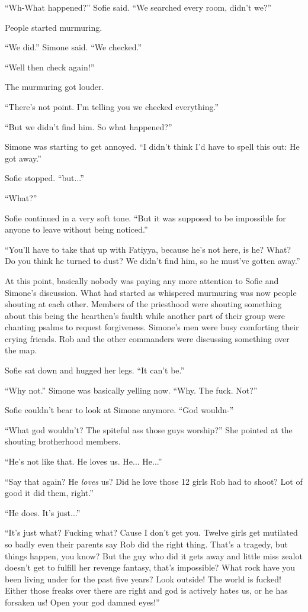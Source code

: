 \documentclass[letterpaper,12pt]{report}
\begin{document}
``Wh-What happened?'' Sofie said. ``We searched every room, didn't we?''

People started murmuring.

``We did.'' Simone said. ``We checked.''

``Well then check again!''

The murmuring got louder.

``There's not point. I'm telling you we checked everything.''

``But we didn't find him. So what happened?''

Simone was starting to get annoyed. ``I didn't think I'd have to spell this out: He got away.''

Sofie stopped. ``but...''

``What?''

Sofie continued in a very soft tone. ``But it was supposed to be impossible for anyone to leave without being noticed.''

``You'll have to take that up with Fatiyya, because he's not here, is he? What? Do you think he turned to dust? We didn't find him, so he must've gotten away.''

At this point, basically nobody was paying any more attention to Sofie and Simone's discussion. What had started as whispered murmuring was now people shouting at each other. Members of the priesthood were shouting something about this being the hearthen's faulth while another part of their group were chanting psalms to request forgiveness. Simone's men were busy comforting their crying friends. Rob and the other commanders were discussing something over the map.

Sofie sat down and hugged her legs. ``It can't be.''

``Why not.'' Simone was basically yelling now. ``Why. The fuck. Not?''

Sofie couldn't bear to look at Simone anymore. ``God wouldn-''

``What god wouldn't? The spiteful ass those guys worship?'' She pointed at the shouting brotherhood members.

``He's not like that. He loves us. He... He...''

``Say that again? He \textit{loves} us? Did he love those 12 girls Rob had to shoot? Lot of good it did them, right.''

``He does. It's just...''

``It's just what? Fucking what? Cause I don't get you. Twelve girls get mutilated so badly even their parents say Rob did the right thing. That's a tragedy, but things happen, you know? But the guy who did it gets away and little miss zealot doesn't get to fulfill her revenge fantasy, that's impossible? What rock have you been living under for the past five years? Look outside! The world is fucked! Either those freaks over there are right and god is actively hates us, or he has forsaken us! Open your god damned eyes!''
\end{document}
